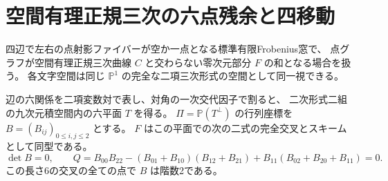 \section{空間有理正規三次の六点残余と四移動}
\label{sec:twisted-cubic-residual}
四辺で左右の点射影ファイバーが空か一点となる標準有限Frobenius窓で、
点グラフが空間有理正規三次曲線 $C$ と交わらない零次元部分 $F$ の和となる場合を扱う。
各文字空間は同じ $\mathbb P^1$ の完全な二項三次形式の空間として同一視できる。
\begin{theorem}\label{thm:twisted-cubic-residual}
辺の六関係を二項変数対で表し、対角の一次交代因子で割ると、
二次形式二組の九次元積空間内の六平面 $T$ を得る。
$\Pi=\mathbb P(T^\perp)$ の行列座標を $B=(B_{ij})_{0\le i,j\le2}$ とする。
$F$ はこの平面での次の二式の完全交叉とスキームとして同型である。
\[
 \det B=0,\qquad
 Q=B_{00}B_{22}-(B_{01}+B_{10})(B_{12}+B_{21})
       + B_{11}(B_{02}+B_{20}+B_{11})=0 .
\]
この長さ6の交叉の全ての点で $B$ は階数2である。
\end{theorem}
